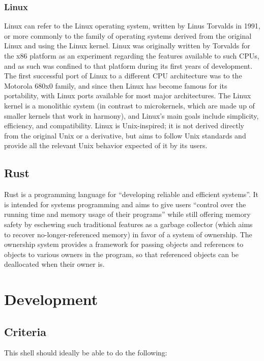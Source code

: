 \documentclass[12pt,twoside]{report} %
\begin{document}
	\subsection{Linux} \label{sec:linux}
	Linux can refer to the Linux operating system, written by Linus Torvalds in 1991, or more commonly to the family of operating systems derived from the original Linux and using the Linux kernel. Linux was originally written by Torvalds for the x86 platform as an experiment regarding the features available to such CPUs, and as such was confined to that platform during its first years of development. The first successful port of Linux to a different CPU architecture was to the Motorola 680x0 family, and since then Linux has become famous for its portability, with Linux ports available for most major architectures. The Linux kernel is a monolithic system (in contrast to microkernels, which are made up of smaller kernels that work in harmony), and Linux's main goals include simplicity, efficiency, and compatibility.\cite{linux} Linux is Unix-inspired; it is not derived directly from the original Unix or a derivative, but aims to follow Unix standards and provide all the relevant Unix behavior expected of it by its users.

	\section{Rust} \label{sec:rust}
	Rust is a programming language for “developing reliable and efficient systems”. It is intended for systems programming and aims to give users “control over the running time and memory usage of their programs” while still offering memory safety by eschewing such traditional features as a garbage collector (which aims to recover no-longer-referenced memory) in favor of a system of ownership. The ownership system provides a framework for passing objects and references to objects to various owners in the program, so that referenced objects can be deallocated when their owner is.\cite{rust}

	\chapter{Development} \label{development}
	
	\section{Criteria} \label{sec:criteria}
	This shell should ideally be able to do the following:
	
\end{document}
